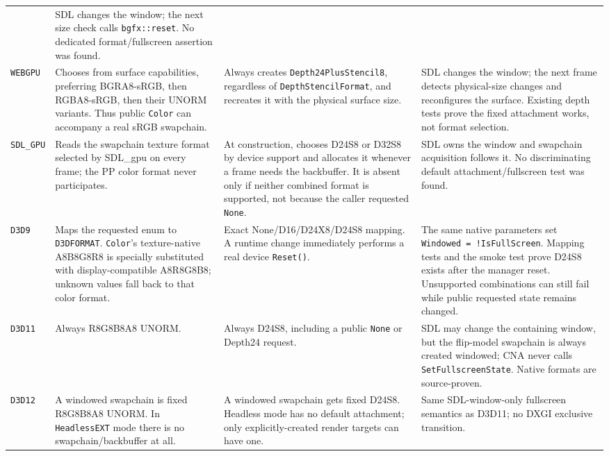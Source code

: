 \begin{longtable}{@{}p{}p{}p{}p{}@{}}
  & SDL changes the window; the next size check calls \texttt{bgfx::reset}. No dedicated
    format/fullscreen assertion was found. \\
\texttt{WEBGPU}
  & Chooses from surface capabilities, preferring BGRA8-sRGB, then RGBA8-sRGB, then their
    UNORM variants. Thus public \texttt{Color} can accompany a real sRGB swapchain.
  & Always creates \texttt{Depth24PlusStencil8}, regardless of
    \texttt{DepthStencilFormat}, and recreates it with the physical surface size.
  & SDL changes the window; the next frame detects physical-size changes and reconfigures the
    surface. Existing depth tests prove the fixed attachment works, not format selection. \\
\texttt{SDL\_GPU}
  & Reads the swapchain texture format selected by SDL\_gpu on every frame; the PP color
    format never participates.
  & At construction, chooses D24S8 or D32S8 by device support and allocates it whenever a
    frame needs the backbuffer. It is absent only if neither combined format is supported,
    not because the caller requested \texttt{None}.
  & SDL owns the window and swapchain acquisition follows it. No discriminating default
    attachment/fullscreen test was found. \\
\texttt{D3D9}
  & Maps the requested enum to \texttt{D3DFORMAT}. \texttt{Color}'s texture-native
    A8B8G8R8 is specially substituted with display-compatible A8R8G8B8; unknown values fall
    back to that color format.
  & Exact None/D16/D24X8/D24S8 mapping. A runtime change immediately performs a real device
    \texttt{Reset()}.
  & The same native parameters set \texttt{Windowed = !IsFullScreen}. Mapping tests and the
    smoke test prove D24S8 exists after the manager reset. Unsupported combinations can still
    fail while public requested state remains changed. \\
\texttt{D3D11}
  & Always R8G8B8A8 UNORM.
  & Always D24S8, including a public \texttt{None} or Depth24 request.
  & SDL may change the containing window, but the flip-model swapchain is always created
    windowed; CNA never calls \texttt{SetFullscreenState}. Native formats are source-proven. \\
\texttt{D3D12}
  & A windowed swapchain is fixed R8G8B8A8 UNORM. In \texttt{HeadlessEXT} mode there is no
    swapchain/backbuffer at all.
  & A windowed swapchain gets fixed D24S8. Headless mode has no default attachment; only
    explicitly-created render targets can have one.
  & Same SDL-window-only fullscreen semantics as D3D11; no DXGI exclusive transition.

\end{longtable}

